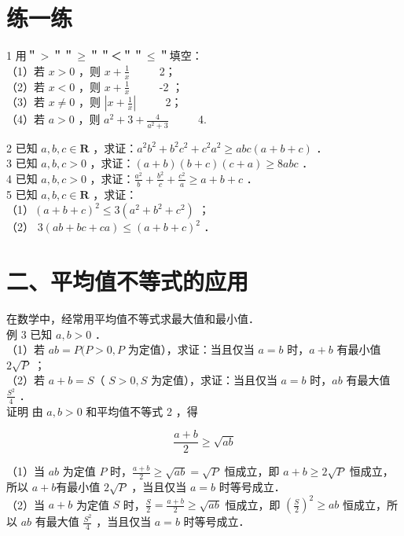 \documentclass[10pt]{article}
\begin{document}
\section*{练一练}
1 用＂\(>\)＂＂\(\geqslant\)＂＂＜＂＂\(\leqslant\)＂填空：\\
（1）若 \(x>0\) ，则 \(x+\frac{1}{x}\) \(\qquad\) 2；\\
（2）若 \(x<0\) ，则 \(x+\frac{1}{x}\) \(\qquad\) -2 ；\\
（3）若 \(x \neq 0\) ，则 \(\left|x+\frac{1}{x}\right|\) \(\qquad\) 2；\\
（4）若 \(a>0\) ，则 \(a^{2}+3+\frac{4}{a^{2}+3}\) \(\qquad\) 4.

2 已知 \(a, b, c \in \mathbf{R}\) ，求证：\(a^{2} b^{2}+b^{2} c^{2}+c^{2} a^{2} \geqslant a b c(a+b+c)\) ．\\
3 已知 \(a, b, c>0\) ，求证：\((a+b)(b+c)(c+a) \geqslant 8 a b c\) ．\\
4 已知 \(a, b, c>0\) ，求证：\(\frac{a^{2}}{b}+\frac{b^{2}}{c}+\frac{c^{2}}{a} \geqslant a+b+c\) ．\\
5 已知 \(a, b, c \in \mathbf{R}\) ，求证：\\
（1）\((a+b+c)^{2} \leqslant 3\left(a^{2}+b^{2}+c^{2}\right)\) ；\\
（2） \(3(a b+b c+c a) \leqslant(a+b+c)^{2}\) ．

\section*{二、平均值不等式的应用}
在数学中，经常用平均值不等式求最大值和最小值．\\
例 3 已知 \(a, b>0\) ．\\
（1）若 \(a b=P(P>0, P\) 为定值），求证：当且仅当 \(a=b\) 时，\(a+b\) 有最小值 \(2 \sqrt{P}\) ；\\
（2）若 \(a+b=S\)（ \(S>0, S\) 为定值），求证：当且仅当 \(a=b\) 时，\(a b\) 有最大值 \(\frac{S^{2}}{4}\) ．\\
证明 由 \(a, b>0\) 和平均值不等式 2 ，得

\[
\frac{a+b}{2} \geqslant \sqrt{a b}
\]

（1）当 \(a b\) 为定值 \(P\) 时，\(\frac{a+b}{2} \geqslant \sqrt{a b}=\sqrt{P}\) 恒成立，即 \(a+b \geqslant 2 \sqrt{P}\) 恒成立，所以 \(a+b\)有最小值 \(2 \sqrt{P}\) ，当且仅当 \(a=b\) 时等号成立．\\
（2）当 \(a+b\) 为定值 \(S\) 时，\(\frac{S}{2}=\frac{a+b}{2} \geqslant \sqrt{a b}\) 恒成立，即 \(\left(\frac{S}{2}\right)^{2} \geqslant a b\) 恒成立，所以 \(a b\) 有最大值 \(\frac{S^{2}}{4}\) ，当且仅当 \(a=b\) 时等号成立．
\end{document}
